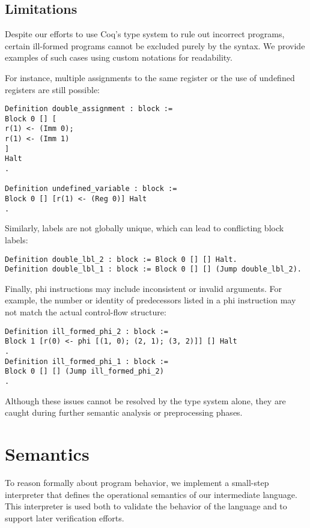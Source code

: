 \subsection{Limitations}

Despite our efforts to use Coq's type system to rule out incorrect programs, certain ill-formed programs cannot be excluded purely by the syntax. We provide examples of such cases using custom notations for readability.

For instance, multiple assignments to the same register or the use of undefined registers are still possible:

\begin{lstlisting}[language=Coq]
Definition double_assignment : block :=
Block 0 [] [
r(1) <- (Imm 0);
r(1) <- (Imm 1)
]
Halt
.

Definition undefined_variable : block :=
Block 0 [] [r(1) <- (Reg 0)] Halt
.
\end{lstlisting}

Similarly, labels are not globally unique, which can lead to conflicting block labels:

\begin{lstlisting}[language=Coq]
Definition double_lbl_2 : block := Block 0 [] [] Halt.
Definition double_lbl_1 : block := Block 0 [] [] (Jump double_lbl_2).
\end{lstlisting}

Finally, phi instructions may include inconsistent or invalid arguments. For example, the number or identity of predecessors listed in a phi instruction may not match the actual control-flow structure:

\begin{lstlisting}[language=Coq]
Definition ill_formed_phi_2 : block :=
Block 1 [r(0) <- phi [(1, 0); (2, 1); (3, 2)]] [] Halt
.
Definition ill_formed_phi_1 : block :=
Block 0 [] [] (Jump ill_formed_phi_2)
.
\end{lstlisting}

Although these issues cannot be resolved by the type system alone, they are caught during further semantic analysis or preprocessing phases.

\section{Semantics}

To reason formally about program behavior, we implement a small-step interpreter that defines the operational semantics of our intermediate language. This interpreter is used both to validate the behavior of the language and to support later verification efforts.

